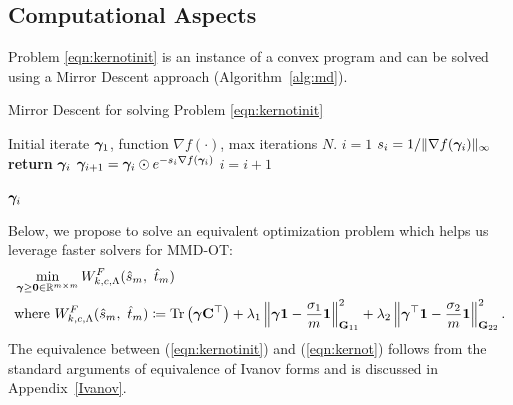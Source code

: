 \subsection{Computational Aspects}\label{comput}
Problem \ref{eqn:kernotinit} is an instance of a convex program and can be solved using a Mirror Descent approach (Algorithm~\ref{alg:md}). 
\begin{algorithm}
\caption[Mirror Descent for solving the proposed OT formulation with MMD regularization.]{Mirror Descent for solving Problem \ref{eqn:kernotinit}}\label{alg:md}
\begin{algorithmic}[1]
\Require Initial iterate $\bm{\gamma}_1$, function $\nabla f(\cdot)$, max iterations $N$.
\State $i=1$
\State $s_i = 1/\|\nabla f(\bm{\gamma}_i)\|_\infty$
\Else
\State \textbf{return} $\bm{\gamma}_i$
\EndIf
\State $\bm{\gamma}_{i+1} = \bm{\gamma}_{i}\odot e^{-s_i\nabla f(\bm{\gamma}_i)}$
\State $i=i+1$
\EndWhile
\end{algorithmic}
\Return $\bm{\gamma}_{i}$
\end{algorithm}
Below, we propose to solve an equivalent optimization problem which helps us leverage faster solvers for MMD-OT:
\begin{align}\label{eqn:kernot}
    &\min\limits_{\bm{\gamma}\ge\mathbf{0}\in\mathbb{R}^{m\times m}} W^F_{k, c, \Lambda}(\hat{s}_m, \ \hat{t}_m) \nonumber \\
    &\textup{where }W^F_{k, c, \Lambda}(\hat{s}_m, \ \hat{t}_m)\coloneqq 
    \textup{Tr}\left(\bm{\gamma}\mathbf{C}^\top\right) + \lambda_1\left\Vert\bm{\gamma}\mathbf{1}-\frac{\sigma_1}{m}\mathbf{1}\right\Vert^2_{\mathbf{G}_{11}}+\lambda_2\left\Vert\bm{\gamma}^\top\mathbf{1}-\frac{\sigma_2}{m}\mathbf{1}\right\Vert^2_{\mathbf{G}_{22}}.
\end{align}
The equivalence between (\ref{eqn:kernotinit}) and (\ref{eqn:kernot}) follows from the standard arguments of equivalence of Ivanov forms and is discussed in Appendix~\ref{Ivanov}. 


